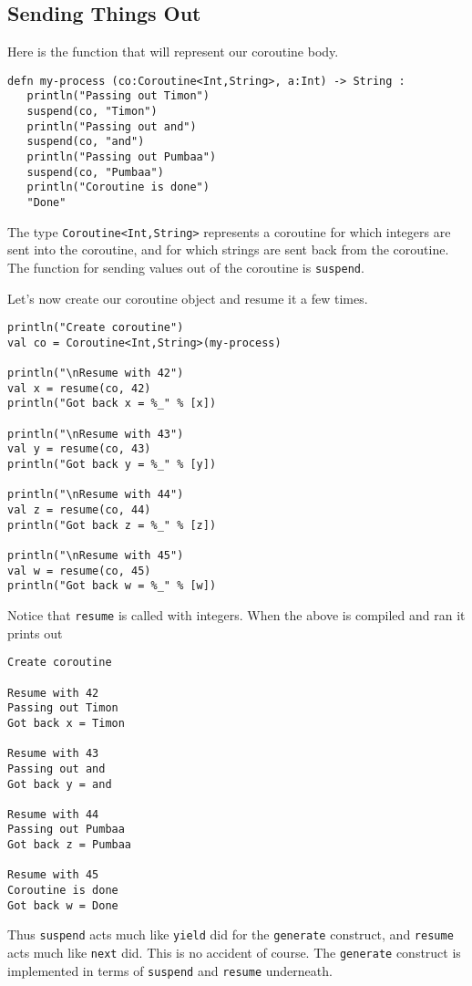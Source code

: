 \documentclass[10pt,oneside]{book}
\begin{document}
\subsection*{Sending Things Out}
Here is the function that will represent our coroutine body.
\begin{lstlisting}
defn my-process (co:Coroutine<Int,String>, a:Int) -> String :
   println("Passing out Timon")
   suspend(co, "Timon")
   println("Passing out and")
   suspend(co, "and")
   println("Passing out Pumbaa")
   suspend(co, "Pumbaa")
   println("Coroutine is done")
   "Done"
\end{lstlisting}
The type \texttt{\frenchspacing Coroutine<Int,String>} represents a coroutine for which integers are sent into the coroutine, and for which strings are sent back from the coroutine. The function for sending values out of the coroutine is \texttt{\frenchspacing suspend}. 

Let's now create our coroutine object and resume it a few times.
\begin{lstlisting}
println("Create coroutine")
val co = Coroutine<Int,String>(my-process)

println("\nResume with 42")
val x = resume(co, 42)
println("Got back x = %_" % [x])

println("\nResume with 43")
val y = resume(co, 43)
println("Got back y = %_" % [y])

println("\nResume with 44")
val z = resume(co, 44)
println("Got back z = %_" % [z])

println("\nResume with 45")
val w = resume(co, 45)
println("Got back w = %_" % [w])
\end{lstlisting}
Notice that \texttt{\frenchspacing resume} is called with integers. When the above is compiled and ran it prints out
\begin{lstlisting}
Create coroutine

Resume with 42
Passing out Timon
Got back x = Timon

Resume with 43
Passing out and
Got back y = and

Resume with 44
Passing out Pumbaa
Got back z = Pumbaa

Resume with 45
Coroutine is done
Got back w = Done
\end{lstlisting}
Thus \texttt{\frenchspacing suspend} acts much like \texttt{\frenchspacing yield} did for the \texttt{\frenchspacing generate} construct, and \texttt{\frenchspacing resume} acts much like \texttt{\frenchspacing next} did. This is no accident of course. The \texttt{\frenchspacing generate} construct is implemented in terms of \texttt{\frenchspacing suspend} and \texttt{\frenchspacing resume} underneath.
\end{document}
